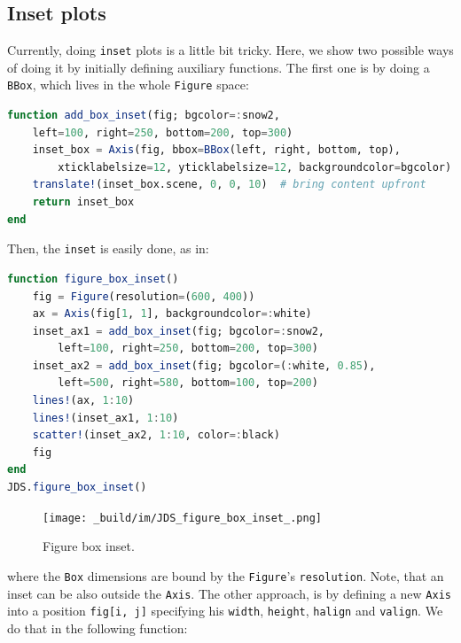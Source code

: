 \documentclass[
  notoc %
]{tufte-book}
\newcommand{\passthrough}[1]{#1}
\begin{document}
\hypertarget{inset-plots}{%
\subsection{Inset plots}\label{inset-plots}}

Currently, doing \passthrough{\lstinline!inset!} plots is a little bit
tricky. Here, we show two possible ways of doing it by initially
defining auxiliary functions. The first one is by doing a
\passthrough{\lstinline!BBox!}, which lives in the whole
\passthrough{\lstinline!Figure!} space:

\begin{lstlisting}[language=Julia]
function add_box_inset(fig; bgcolor=:snow2,
    left=100, right=250, bottom=200, top=300)
    inset_box = Axis(fig, bbox=BBox(left, right, bottom, top),
        xticklabelsize=12, yticklabelsize=12, backgroundcolor=bgcolor)
    translate!(inset_box.scene, 0, 0, 10)  # bring content upfront
    return inset_box
end
\end{lstlisting}

Then, the \passthrough{\lstinline!inset!} is easily done, as in:

\begin{lstlisting}[language=Julia]
function figure_box_inset()
    fig = Figure(resolution=(600, 400))
    ax = Axis(fig[1, 1], backgroundcolor=:white)
    inset_ax1 = add_box_inset(fig; bgcolor=:snow2,
        left=100, right=250, bottom=200, top=300)
    inset_ax2 = add_box_inset(fig; bgcolor=(:white, 0.85),
        left=500, right=580, bottom=100, top=200)
    lines!(ax, 1:10)
    lines!(inset_ax1, 1:10)
    scatter!(inset_ax2, 1:10, color=:black)
    fig
end
JDS.figure_box_inset()
\end{lstlisting}

\begin{figure}
\hypertarget{fig:figure_box_inset}{%
\centering
\texttt{[image: \_build/im/JDS\_figure\_box\_inset\_.png]}
\caption{Figure box inset.}\label{fig:figure_box_inset}
}
\end{figure}

where the \passthrough{\lstinline!Box!} dimensions are bound by the
\passthrough{\lstinline!Figure!}'s \passthrough{\lstinline!resolution!}.
Note, that an inset can be also outside the
\passthrough{\lstinline!Axis!}. The other approach, is by defining a new
\passthrough{\lstinline!Axis!} into a position
\passthrough{\lstinline!fig[i, j]!} specifying his
\passthrough{\lstinline!width!}, \passthrough{\lstinline!height!},
\passthrough{\lstinline!halign!} and \passthrough{\lstinline!valign!}.
We do that in the following function:
\end{document}
